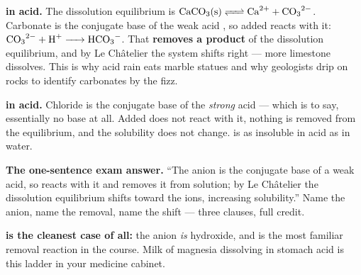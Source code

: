 \documentclass{apchem-worksheet}
\begin{document}
\begin{center}
\end{center}

\begin{workedexample}
\textbf{ in acid.} The dissolution equilibrium is
$\ce{CaCO3(s) <=> Ca^2+ + CO3^2-}$. Carbonate is the conjugate base of
the weak acid , so added  reacts with it:
$\ce{CO3^2- + H+ -> HCO3-}$. That \textbf{removes a product} of the
dissolution equilibrium, and by Le Ch\^{a}telier the system shifts
right --- more limestone dissolves. This is why acid rain eats marble
statues and why geologists drip  on rocks to identify
carbonates by the fizz.

\textbf{ in acid.} Chloride is the conjugate base of the
\emph{strong} acid  --- which is to say, essentially no base at
all. Added  does not react with it, nothing is removed from the
equilibrium, and the solubility does not change.  is as
insoluble in acid as in water.

\textbf{The one-sentence exam answer.} ``The anion is the conjugate
base of a weak acid, so  reacts with it and removes it from
solution; by Le Ch\^{a}telier the dissolution equilibrium shifts toward
the ions, increasing solubility.'' Name the anion, name the removal,
name the shift --- three clauses, full credit.

\textbf{ is the cleanest case of all:} the anion \emph{is}
hydroxide, and  is the most familiar removal
reaction in the course. Milk of magnesia dissolving in stomach acid is
this ladder in your medicine cabinet.
\end{workedexample}
\end{document}
